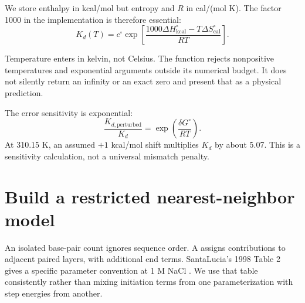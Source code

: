 
We store enthalpy in kcal/mol but entropy and $R$ in cal/(mol K).
The factor 1000 in the implementation is therefore essential:
\begin{equation}
K_d(T)=c^\circ\exp\left[
\frac{1000\Delta H^\circ_{\mathrm{kcal}}-T\Delta S^\circ_{\mathrm{cal}}}
{RT}\right].
\end{equation}


Temperature enters in kelvin, not Celsius. The function rejects nonpositive
temperatures and exponential arguments outside its numerical budget.
It does not silently return an infinity or an exact zero and present that
as a physical prediction.

The error sensitivity is exponential:
\begin{equation}
\frac{K_{d,\mathrm{perturbed}}}{K_d}
=\exp\left(\frac{\delta G^\circ}{RT}\right).
\end{equation}
At 310.15 K, an assumed $+1$ kcal/mol shift multiplies $K_d$ by about 5.07.
This is a sensitivity calculation, not a universal mismatch penalty.

\section{Build a restricted nearest-neighbor model}

An isolated base-pair count ignores sequence order. A
 assigns contributions to adjacent paired
layers, with additional end terms. SantaLucia's 1998 Table 2 gives a
specific parameter convention at 1 M NaCl \cite{santalucia}.
We use that table consistently rather than mixing initiation terms from
one parameterization with step energies from another.



